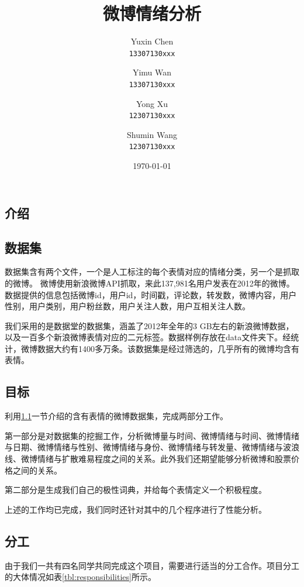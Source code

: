 \documentclass[12pt, oneside]{article}
\title{微博情绪分析}
\author{
	Yuxin Chen\\
	\texttt{13307130xxx}
	\and
	Yimu Wan\\
	\texttt{13307130xxx}
	\and
	Yong Xu\\
	\texttt{12307130xxx}
	\and
	Shumin Wang\\
	\texttt{12307130xxx}
}
\date{\today}
\begin{document}
\begin{spacing}{1.5}
\begin{CJK}{UTF8}{gbsn}

\maketitle

\tableofcontents

\newpage

\section{介绍}
\subsection{数据集}
\label{subsec:dataset}
数据集含有两个文件，一个是人工标注的每个表情对应的情绪分类，另一个是抓取的微博。
微博使用新浪微博API抓取，来此137,981名用户发表在2012年的微博。数据提供的信息包括微博id，用户id，时间戳，评论数，转发数，微博内容，用户性别，用户类别，用户粉丝数，用户关注人数，用户互相关注人数。

我们采用的是数据堂的数据集，涵盖了2012年全年的3 GB左右的新浪微博数据，以及一百多个新浪微博表情对应的二元标签。数据样例存放在data文件夹下。经统计，微博数据大约有1400多万条。该数据集是经过筛选的，几乎所有的微博均含有表情。

\subsection{目标}
利用\ref{subsec:dataset}一节介绍的含有表情的微博数据集，完成两部分工作。

第一部分是对数据集的挖掘工作，分析微博量与时间、微博情绪与时间、微博情绪与日期、微博情绪与性别、微博情绪与身份、微博情绪与转发量、微博情绪与波浪线、微博情绪与扩散难易程度之间的关系。此外我们还期望能够分析微博和股票价格之间的关系。

第二部分是生成我们自己的极性词典，并给每个表情定义一个积极程度。

上述的工作均已完成，我们同时还针对其中的几个程序进行了性能分析。

\subsection{分工}

由于我们一共有四名同学共同完成这个项目，需要进行适当的分工合作。项目分工的大体情况如表\ref{tbl:responsibilities}所示。


\end{CJK}
\end{spacing}
\end{document}

